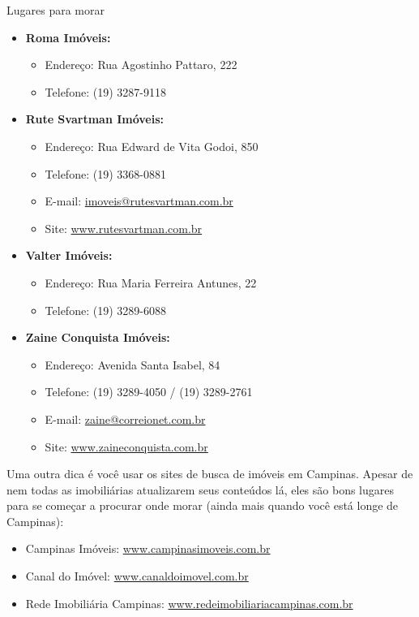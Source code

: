 \begin{story}{Lugares para morar}
\begin{itemize}
\item \textbf{Roma Imóveis:}
\begin{itemize}
\item Endereço: Rua Agostinho Pattaro, 222
\item Telefone: (19) 3287-9118
\end{itemize}

\item \textbf{Rute Svartman Imóveis:}
\begin{itemize}
\item Endereço: Rua Edward de Vita Godoi, 850
\item Telefone: (19) 3368-0881
\item E-mail: \url{imoveis@rutesvartman.com.br}
\item Site: \url{www.rutesvartman.com.br}
\end{itemize}

\item \textbf{Valter Imóveis:}
\begin{itemize}
\item Endereço: Rua Maria Ferreira Antunes, 22
\item Telefone: (19) 3289-6088
\end{itemize}

\item \textbf{Zaine Conquista Imóveis:}
\begin{itemize}
\item Endereço: Avenida Santa Isabel, 84
\item Telefone: (19) 3289-4050 / (19) 3289-2761
\item E-mail: \url{zaine@correionet.com.br}
\item Site: \url{www.zaineconquista.com.br}
\end{itemize}

\end{itemize}

Uma outra dica é você usar os sites de busca de imóveis em Campinas. Apesar de nem todas as imobiliárias atualizarem seus conteúdos lá, eles são bons lugares para se começar a procurar onde morar (ainda mais quando você está longe de Campinas):

\begin{itemize}
\item Campinas Imóveis: \url{www.campinasimoveis.com.br}
\item Canal do Imóvel: \url{www.canaldoimovel.com.br}
\item Rede Imobiliária Campinas: \url{www.redeimobiliariacampinas.com.br}
\end{itemize}

\end{story}


